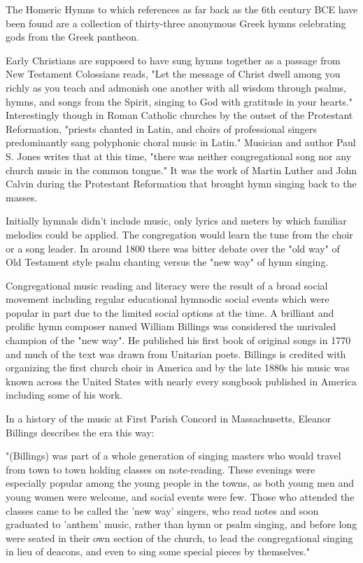 \documentclass[12pt]{article}
\begin{document}
The Homeric Hymns to which references as far back as the 6th century BCE have been found are a collection of thirty-three anonymous Greek hymns celebrating gods from the Greek pantheon.

Early Christians are supposed to have sung hymns together as a passage from New Testament Colossians reads, "Let the message of Christ dwell among you richly as you teach and admonish one another with all wisdom through psalms, hymns, and songs from the Spirit, singing to God with gratitude in your hearts." Interestingly though in Roman Catholic churches by the outset of the Protestant Reformation, "priests chanted in Latin, and choirs of professional singers predominantly sang polyphonic choral music in Latin." Musician and author Paul S. Jones writes that at this time, "there was neither congregational song nor any church music in the common tongue." It was the work of Martin Luther and John Calvin during the Protestant Reformation that brought hymn singing back to the masses.

Initially hymnals didn't include music, only lyrics and meters by which familiar melodies could be applied. The congregation would learn the tune from the choir or a song leader. In around 1800 there was bitter debate over the "old way" of Old Testament style psalm chanting versus the "new way" of hymn singing.

Congregational music reading and literacy were the result of a broad social movement including regular educational hymnodic social events which were popular in part due to the limited social options at the time. A brilliant and prolific hymn composer named William Billings was considered the unrivaled champion of the "new way". He published his first book of original songs in 1770 and much of the text was drawn from Unitarian poets. Billings is credited with organizing the first church choir in America and by the late 1880s his music was known across the United States with nearly every songbook published in America including some of his work.

In a history of the music at First Parish Concord in Massachusetts, Eleanor Billings describes the era this way:

"(Billings) was part of a whole generation of singing masters who would travel from town to town holding classes on note-reading. These evenings were especially popular among the young people in the towns, as both young men and young women were welcome, and social events were few. Those who attended the classes came to be called the 'new way' singers, who read notes and soon graduated to 'anthem' music, rather than hymn or psalm singing, and before long were seated in their own section of the church, to lead the congregational singing in lieu of deacons, and even to sing some special pieces by themselves."
\end{document}
